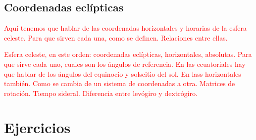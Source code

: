 \subsection{Coordenadas eclípticas}

\begin{Anotacion}
	\textcolor{red}{Aquí tenemos que hablar de las coordenadas horizontales y horarias de la esfera celeste. Para que sirven cada una, como se definen. Relaciones entre ellas.}
\end{Anotacion}	



\begin{Anotacion}
	\textcolor{red}{Esfera celeste, en este orden: coordenadas eclípticas, horizontales, absolutas. Para que sirve cada uno, cuales son los ángulos de referencia. En las ecuatoriales hay que hablar de los ángulos del equinocio y solscitio del sol. En lass horizontales también. Como se cambia de un sistema de coordenadas a otra. Matrices de rotación. Tiempo sideral. Diferencia entre levógiro y dextrógiro. }
\end{Anotacion}	


\section{Ejercicios}


